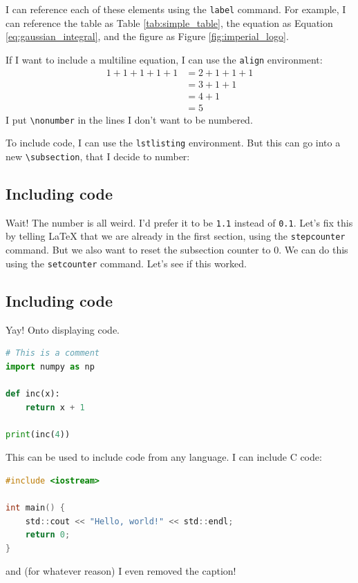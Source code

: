 \documentclass[12pt,twoside]{article}
\begin{document}
I can reference each of these elements using the \texttt{label} command. For
example, I can reference the table as Table \ref{tab:simple_table}, the equation
as Equation \ref{eq:gaussian_integral}, and the figure as Figure
\ref{fig:imperial_logo}.

If I want to include a multiline equation, I can use the \texttt{align} 
environment:
\begin{align}
    1+1+1+1+1&=2+1+1+1 \nonumber\\
    &=3+1+1 \\
    &=4+1 \nonumber\\
    &=5
\end{align}
I put \texttt{\textbackslash nonumber} in the lines I don't want to be numbered.

To include code, I can use the \texttt{lstlisting} environment. But this can
go into a new \texttt{\textbackslash subsection}, that I decide to number:

\subsection{Including code}

Wait! The number is all weird. I'd prefer it to be \texttt{1.1} instead of
\texttt{0.1}. Let's fix this by telling LaTeX that we are already in the first
section, using the \texttt{stepcounter} command.
But we also want to reset the subsection counter to 0. We can do this using the
\texttt{setcounter} command.
\setcounter{subsection}{0}
Let's see if this worked.

\subsection{Including code}

Yay! Onto displaying code.

\begin{lstlisting}[language=Python, caption=Python example]
# This is a comment
import numpy as np

def inc(x):
    return x + 1

print(inc(4))
\end{lstlisting}
This can be used to include code from any language. I can include C code:
\begin{lstlisting}[language=C]
#include <iostream>

int main() {
    std::cout << "Hello, world!" << std::endl;
    return 0;
}
\end{lstlisting}
and (for whatever reason) I even removed the caption!
\end{document}
